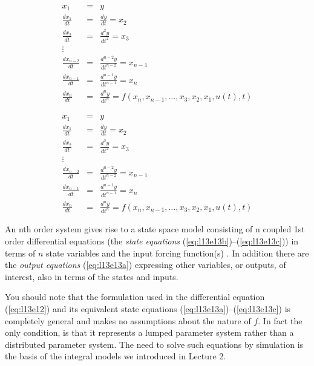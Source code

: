 \begin{eqnarray}
	x_1 & = & y \label{eq:l13e13a}\\
	\frac{dx_1}{dt} & = & \frac{dy}{dt} = x_2  \label{eq:l13e13b} \\
    \frac{dx_2}{dt} & = & \frac{d^2y}{dt^2} = x_3   \\
	 \vdots      \nonumber \\
	\frac{dx_{n-2}}{dt} & = & \frac{d^{n-2}y}{dt^{n-2}} = x_{n-1}   \\
	\frac{dx_{n-1}}{dt} & = & \frac{d^{n-1}y}{dt^{n-1}} = x_n   \\
    \frac{dx_n}{dt} &=& \frac{d^{n}y}{dt^{n}} =  f\left(x_n, x_{n-1}, \ldots, x_3, x_2, x_1, u(t), t \right) \label{eq:l13e13c}
\end{eqnarray}
\ifslidesonly
\begin{slide}
	\begin{eqnarray}
		x_1 & = & y \\
		\frac{dx_1}{dt} & = & \frac{dy}{dt} = x_2  \\
	    \frac{dx_2}{dt} & = & \frac{d^2y}{dt^2} = x_3   \\
		 \vdots      \nonumber \\
		\frac{dx_{n-2}}{dt} & = & \frac{d^{n-2}y}{dt^{n-2}} = x_{n-1}   \\
		\frac{dx_{n-1}}{dt} & = & \frac{d^{n-1}y}{dt^{n-1}} = x_n   \\
	    \frac{dx_n}{dt} &=& \frac{d^{n}y}{dt^{n}} =  f\left(x_n, x_{n-1}, \ldots, x_3, x_2, x_1, u(t), t \right) 
	\end{eqnarray}
\end{slide}
\fi
An nth order system gives rise to a state space model consisting of n coupled 1st order differential equations (the \emph{state equations} (\ref{eq:l13e13b})--(\ref{eq:l13e13c})) in terms of $n$ state variables and the input forcing function(s) . In addition there are the \emph{output equations} (\ref{eq:l13e13a}) expressing other variables, or outputs, of interest, also in terms of the states and inputs.

You should note that the formulation used in the differential equation (\ref{eq:l13e12}) and its equivalent state equations (\ref{eq:l13e13a})--(\ref{eq:l13e13c}) is completely general and makes no assumptions about the nature of $f$. In fact the only condition, is that it represents a lumped parameter system rather than a distributed parameter system. The need to solve such equations by simulation is the basis of the integral models we introduced in Lecture 2.
 
